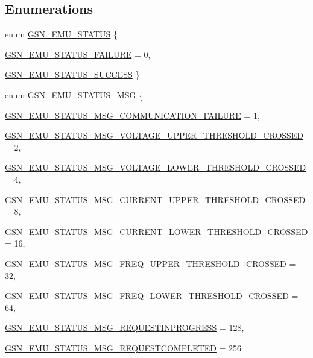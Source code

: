 \subsection*{Enumerations}
\begin{DoxyCompactItemize}
\item 
enum \hyperlink{a00490_ab4db26a19622c2d88752fa95dfa482e4}{GSN\_\-EMU\_\-STATUS} \{ \par
\hyperlink{a00490_ab4db26a19622c2d88752fa95dfa482e4ac167f61dfc8ebd7d3e94288b5e3ef8db}{GSN\_\-EMU\_\-STATUS\_\-FAILURE} =  0, 
\par
\hyperlink{a00490_ab4db26a19622c2d88752fa95dfa482e4af38d177922ae14e1427b2995484c87d7}{GSN\_\-EMU\_\-STATUS\_\-SUCCESS}
 \}
\item 
enum \hyperlink{a00490_af20d5f49a2180518c67918891814b64d}{GSN\_\-EMU\_\-STATUS\_\-MSG} \{ \par
\hyperlink{a00490_af20d5f49a2180518c67918891814b64dada2007c04b8f7e308b22ee79844cd0d9}{GSN\_\-EMU\_\-STATUS\_\-MSG\_\-COMMUNICATION\_\-FAILURE} =  1, 
\par
\hyperlink{a00490_af20d5f49a2180518c67918891814b64da8d6526b9ea12c8587647e73aa44ca103}{GSN\_\-EMU\_\-STATUS\_\-MSG\_\-VOLTAGE\_\-UPPER\_\-THRESHOLD\_\-CROSSED} =  2, 
\par
\hyperlink{a00490_af20d5f49a2180518c67918891814b64da26f7372a87bb6d2ed14bfa0b5c57a521}{GSN\_\-EMU\_\-STATUS\_\-MSG\_\-VOLTAGE\_\-LOWER\_\-THRESHOLD\_\-CROSSED} =  4, 
\par
\hyperlink{a00490_af20d5f49a2180518c67918891814b64dae715afd28b9888427501946026182a5e}{GSN\_\-EMU\_\-STATUS\_\-MSG\_\-CURRENT\_\-UPPER\_\-THRESHOLD\_\-CROSSED} =  8, 
\par
\hyperlink{a00490_af20d5f49a2180518c67918891814b64da27658d2c171b4ae8d454c8608cf6997a}{GSN\_\-EMU\_\-STATUS\_\-MSG\_\-CURRENT\_\-LOWER\_\-THRESHOLD\_\-CROSSED} =  16, 
\par
\hyperlink{a00490_af20d5f49a2180518c67918891814b64da0e996b86fef7a2ca9d7ba1051ac84ee7}{GSN\_\-EMU\_\-STATUS\_\-MSG\_\-FREQ\_\-UPPER\_\-THRESHOLD\_\-CROSSED} =  32, 
\par
\hyperlink{a00490_af20d5f49a2180518c67918891814b64da8e8facd25ad3b9da1d62209df4d54995}{GSN\_\-EMU\_\-STATUS\_\-MSG\_\-FREQ\_\-LOWER\_\-THRESHOLD\_\-CROSSED} =  64, 
\par
\hyperlink{a00490_af20d5f49a2180518c67918891814b64da3b44536017e0cbb7d389ba09576d5f50}{GSN\_\-EMU\_\-STATUS\_\-MSG\_\-REQUESTINPROGRESS} =  128, 
\par
\hyperlink{a00490_af20d5f49a2180518c67918891814b64da5f208e0ded6153dbf15a9fd0f76c307f}{GSN\_\-EMU\_\-STATUS\_\-MSG\_\-REQUESTCOMPLETED} =  256

\end{DoxyCompactItemize}
